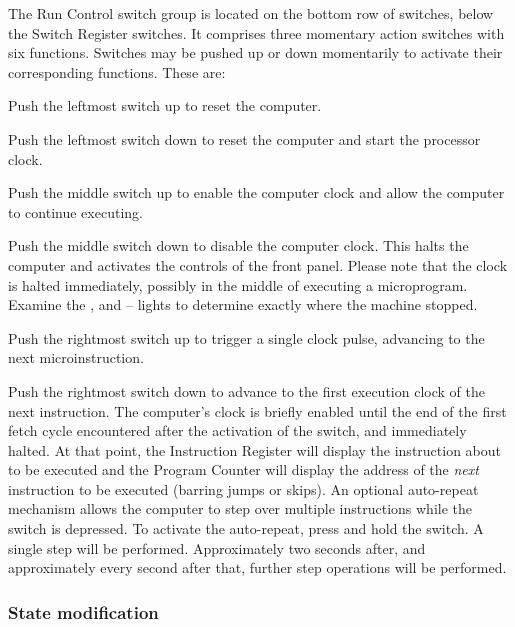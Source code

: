 The Run Control switch group is located on the bottom row of switches,
below the Switch Register switches. It comprises three momentary
action switches with six functions. Switches may be pushed up or down
momentarily to activate their corresponding functions. These are:

\begin{description}
\item{\bfseries{}} Push the leftmost switch up to reset the
computer.
\item{\bfseries{}} Push the leftmost switch down to reset the
computer and start the processor clock.
\item{\bfseries{}} Push the middle switch up to enable the computer
  clock and allow the computer to continue executing.
\item{\bfseries{}} Push the middle switch down to disable the
  computer clock. This halts the computer and activates the controls
  of the front panel. Please note that the clock is halted
  immediately, possibly in the middle of executing a
  microprogram. Examine the ,  and
  – lights to determine exactly where the
  machine stopped.
\item{\bfseries{}} Push the rightmost switch up to trigger a single
  clock pulse, advancing to the next microinstruction.
\item{\bfseries{}} Push the rightmost switch down to advance to the
  first execution clock of the next instruction. The computer's clock
  is briefly enabled until the end of the first fetch cycle
  encountered after the activation of the switch, and immediately
  halted. At that point, the Instruction Register will display the
  instruction about to be executed and the Program Counter will
  display the address of the {\em next\/} instruction to be executed
  (barring jumps or skips). An optional auto-repeat mechanism allows
  the computer to step over multiple instructions while the 
  switch is depressed. To activate the auto-repeat, press and hold the
  switch. A single step will be performed. Approximately two seconds
  after, and approximately every second after that, further step
  operations will be performed.
\end{description}

\subsubsection{State modification}


